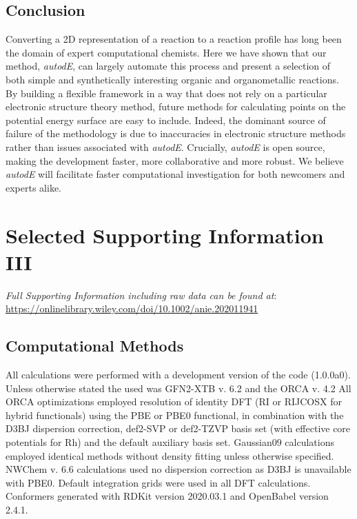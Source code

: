 \documentclass[../../main.tex]{subfiles}
\begin{document}
\subsection{Conclusion}

Converting a 2D representation of a reaction to a reaction profile has long been the domain of expert computational chemists. Here we have shown that our method, \emph{autodE}, can largely automate this process and present a selection of both simple and synthetically interesting organic and organometallic reactions. By building a flexible framework in a way that does not rely on a particular electronic structure theory method, future methods for calculating points on the potential energy surface are easy to include. Indeed, the dominant source of failure of the methodology is due to inaccuracies in electronic structure methods rather than issues associated with \emph{autodE}. Crucially, \emph{autodE} is open source, making the development faster, more collaborative and more robust. We believe \emph{autodE} will facilitate faster computational investigation for both newcomers and experts alike.


\clearpage

\section{Selected Supporting Information III}
\emph{Full Supporting Information including raw data can be found at}:\\ {\url{https://onlinelibrary.wiley.com/doi/10.1002/anie.202011941}}


\subsection{Computational Methods}

All \ade calculations were performed with a development version of the code (1.0.0a0). Unless otherwise stated the \lmethodx used was GFN2-XTB v. 6.2\cite{Bannwarth2019} and the \hmethodx ORCA v. 4.2\cite{Neese2017} All ORCA optimizations employed resolution of identity DFT (RI or RIJCOSX for hybrid functionals)\cite{Neese2003, Neese2009} using the PBE\cite{Perdew1996} or PBE0\cite{Adamo1999} functional, in combination with the D3BJ dispersion correction,\cite{Grimme2010, Grimme2011} def2-SVP or def2-TZVP basis set\cite{Weigend2005} (with effective core potentials for Rh) and the default auxiliary basis set.\cite{Weigend2006} Gaussian09\cite{G09} calculations employed identical methods without density fitting unless otherwise specified. NWChem v. 6.6\cite{Valiev2010} calculations used no dispersion correction as D3BJ is unavailable with PBE0. Default integration grids were used in all DFT calculations. Conformers generated with RDKit\cite{Landrum2019} version 2020.03.1 and OpenBabel version 2.4.1.
\end{document}
